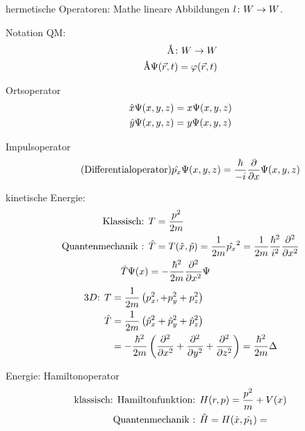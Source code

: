 \begin{bem}
    \item hermetische Operatoren: Mathe lineare Abbildungen $l \colon W \rightarrow W$.

    Notation QM:
    \begin{align*}
        \mbox{\normalfont\AA} \colon W \rightarrow W \\
        \mbox{\normalfont\AA} \Psi(\vec{r},t) = \varphi(\vec{r},t)
    \end{align*}
    \begin{bei}
        \item{Ortsoperator}
        \begin{align*}
            \hat{x}\Psi(x,y,z) &= x \Psi(x,y,z)\\
            \hat{y}\Psi(x,y,z) &= y \Psi(x,y,z)
        \end{align*}
        \item{Impulsoperator}
        \begin{equation*}
            \tag{Differentialoperator}
            \hat{p_x} \Psi (x,y,z) = \frac{\hbar}{-i}\frac{\partial}{\partial x}\Psi (x,y,z)
        \end{equation*}
        \item{kinetische Energie:} 
            \begin{align*}
                \text{Klassisch: } & T= \frac{p^2}{2m} \\
                \text{Quantenmechanik : } & \hat{T} = T(\hat{x},\hat{p}) 
                = \frac{1}{2m}\hat{p_x}^2 
                = \frac{1}{2m}\frac{\hbar^2}{i^2}\frac{\partial^2}{\partial x^2} \\
                \hat{T}\Psi(x)&= -\frac{\hbar^2}{2m}\frac{\partial^2}{\partial x^2}\Psi
            \end{align*}
            \begin{align*}
                \text{$3D$: } T &= \frac{1}{2m}\left( p_x^2, + p_y^2 + p_z^2 \right) \\
                \hat{T} &= \frac{1}{2m}\left( \hat{p}_x^2 + \hat{p}_y^2 + \hat{p}_z^2\right)\\
                &= -\frac{\hbar^2}{2m}\left( \frac{\partial^2}{\partial x^2}+\frac{\partial^2}{\partial 
                y^2}+\frac{\partial^2}{\partial z^2} \right) = \frac{\hbar^2}{2m}\Delta
            \end{align*}
        \item{Energie: Hamiltonoperator}
            \begin{align*}
                \text{klassisch: Hamiltonfunktion: } &
                H(r,p)=\frac{p^2}{m}+V(x)\\
                \text{\QM: } &\h{H} = H (\h{x},\h{p_1})=

\end{align*}
\end{bei}
\end{bem}
